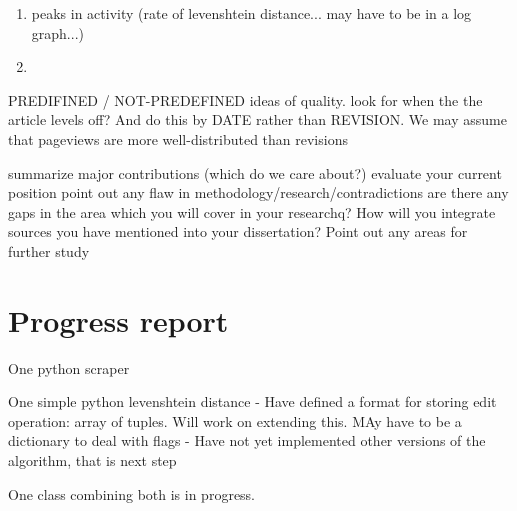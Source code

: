 \documentclass[a4paper,11pt,twoside,notitlepage]{article}
\begin{document}
        \begin{enumerate}
          \item peaks in activity (rate of levenshtein distance... may
            have to be in a log graph...)
          \item 
        \end{enumerate}

        PREDIFINED / NOT-PREDEFINED ideas of quality. look for when
        the the article levels off? And do this by DATE rather than
        REVISION. We may assume that pageviews are more
        well-distributed than revisions

        summarize major contributions (which do we care about?)
        evaluate your current position point out any flaw in
        methodology/research/contradictions are there any gaps in the
        area which you will cover in your researchq?  How will you
        integrate sources you have mentioned into your dissertation?
        Point out any areas for further study


        \section{Progress report}
        One python scraper

        One simple python levenshtein distance
        - Have defined a format for storing edit operation: array of
        tuples. Will work on extending this. MAy have to be a
        dictionary to deal with flags
        - Have not yet implemented other versions of the algorithm,
        that is next step

        One class combining both is in progress.
        
        \clearpage
        \printbibheading[heading=bibintoc,title={References}]
        \printbibliography
        
\end{document}
